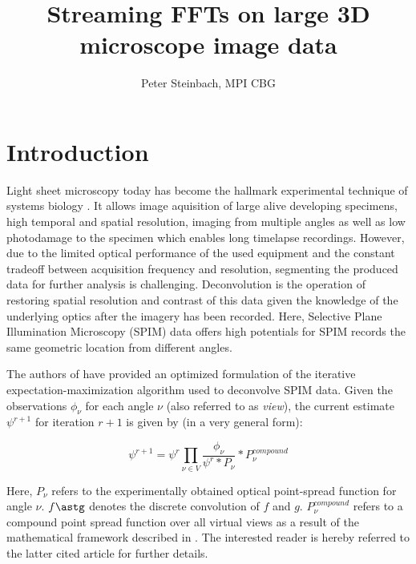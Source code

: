 \documentclass [12pt]{article}
\title{Streaming FFTs on large 3D microscope image data}
\author{Peter Steinbach, MPI CBG}
\begin{document}
\maketitle
\begin{abstract}

\end{abstract}

\section{Introduction}

Light sheet microscopy today has become the hallmark experimental technique of systems biology \cite{Huisken13082004, Keller14112008}. It allows image aquisition of large alive developing specimens, high temporal and spatial resolution, imaging from multiple angles as well as low photodamage to the specimen which enables long timelapse recordings. However, due to the limited optical performance of the used equipment and the constant tradeoff between acquisition frequency and resolution, segmenting the produced data for further analysis is challenging. Deconvolution is the operation of restoring spatial resolution and contrast of this data given the knowledge of the underlying optics after the imagery has been recorded. Here, Selective Plane Illumination Microscopy (SPIM) data offers high potentials for SPIM records the same geometric location from different angles.\newline

The authors of \cite{2013arXiv1308.0730P} have provided an optimized formulation of the iterative expectation-maximization algorithm used to deconvolve SPIM data. Given the observations $\phi_\nu$ for each angle $\nu$ (also referred to as \textit{view}), the current estimate $\psi^{r+1}$ for iteration $r+1$ is given by (in a very general form):

\begin{equation}
\psi^{r+1} = \psi^{r} \prod_{\nu \in V} \frac{\phi_{\nu}}{\psi^{r} \ast P_{\nu} } \ast P^{compound}_{\nu}
\end{equation}

Here, $P_{\nu}$ refers to the experimentally obtained optical point-spread function for angle $\nu$. $f\astg$ denotes the discrete convolution of $f$ and $g$. $P^{compound}_{\nu}$ refers to a compound point spread function over all virtual views as a result of the mathematical framework described in \cite{2013arXiv1308.0730P}. The interested reader is hereby referred to the latter cited article for further details.\newline
\end{document}
